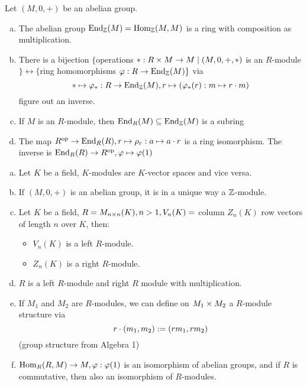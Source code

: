 \documentclass[a4paper]{report}
\begin{document}
\begin{rem}[Excersize]
  Let $(M, 0, +)$ be an abelian group.
  \begin{enumerate}[(a)]
    \item The abelian group $\operatorname{End}_{\mathbb{Z}}(M) = \operatorname{Hom}_{\mathbb{Z}}(M,M)$ is a ring with composition as multiplication.
    \item There is a bijection $\{$operations $*: R \times M \to M \mid (M,0,+,*)$ is an $R$-module$\} \leftrightarrow \{$ring homomorphisms $\varphi: R \to \operatorname{End}_{\mathbb{Z}}(M)\}$ via \[* \mapsto \varphi_{*}: R \to \operatorname{End}_{\mathbb{Z}}(M), r \mapsto (\varphi_{*}(r): m \mapsto r \cdot m)\]figure out an inverse.
    \item If $M$ is an $R$-module, then $\operatorname{End}_{R}(M) \subseteq \operatorname{End}_{\mathbb{Z}}(M)$ is a subring
    \item The map $R^\text{op} \to \operatorname{End}_{R}(R), r \mapsto \rho_{r}: a \mapsto a \cdot r$ is a ring isomorphism. The inverse is $\operatorname{End}_{R}(R) \to R^\text{op}, \varphi \mapsto \varphi(1)$
  \end{enumerate}
\end{rem}

\begin{exmp}
\begin{enumerate}[(a)]
        \item Let $K$ be a field, $K$-modules are $K$-vector spaces and vice versa.
  \item If $(M, 0, +)$ is an abelian group, it is in a unique way a $\mathbb{Z}$-module.
  \item Let $K$ be a field, $R = M_{n \times n}(K), n > 1, V_{n}(K) =$ column $Z_{n}(K)$ row vectors of length $n$ over $K$, then:
        \begin{itemize}
          \item $V_{n}(K)$ is a left $R$-module.
                \item $Z_{n}(K)$ is a right $R$-module.
        \end{itemize}
  \item $R$ is a left $R$-module and right $R$ module with multiplication.
  \item If $M_{1}$ and $M_{2}$ are $R$-modules, we can define on $M_{1} \times M_{2}$ a $R$-module structure via
        \[r \cdot (m_{1}, m_{2}) := (rm_{1}, rm_{2})\] (group structure from Algebra 1)
        \item $\operatorname{Hom}_{R}(R, M) \to M, \varphi: \varphi(1)$ is an isomorphism of abelian groups, and if $R$ is commutative, then also an isomorphism of $R$-modules.
\end{enumerate}
\end{exmp}
\end{document}
